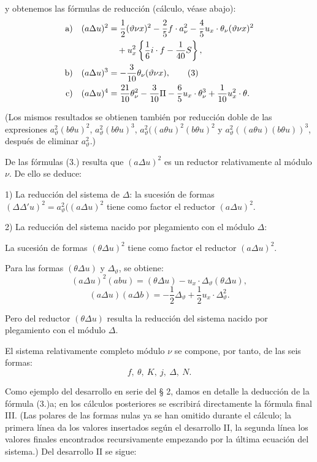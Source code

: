 \documentclass[11pt]{article}
\newcommand{\A}{\Delta}
\begin{document}
y obtenemos las fórmulas de reducción (cálculo, véase abajo):
\begin{align}
\text{a)}\quad (a\A u)^2
&=\frac12(\vartheta\nu x)^2-\frac25 f\cdot a_\nu^2
-\frac45u_x\cdot\theta_\nu(\vartheta\nu x)^2 \notag\\
&\quad+u_x^2\left\{\frac16 i\cdot f-\frac1{40}S\right\},\notag\\
\text{b)}\quad (a\A u)^3
&=-\frac3{10}\theta_\nu(\vartheta\nu x),\tag{3}\\
\text{c)}\quad (a\A u)^4
&=\frac{21}{10}\theta_\nu^2-\frac3{10}\Pi
-\frac65u_x\cdot\theta_\nu^3+\frac1{10}u_x^2\cdot\theta .\notag
\end{align}

(Los mismos resultados se obtienen también por reducción doble de las expresiones $a_\vartheta^2(b\theta u)^2$, $a_\vartheta^2(b\theta u)^3$, $a_\vartheta^2((a\theta u)^2(b\theta u)^2$ y $a_\vartheta^2((a\theta u)(b\theta u))^3$, después de eliminar $a_\vartheta^2$.)

De las fórmulas (3.) resulta que $(a\A u)^2$ es un reductor relativamente al módulo $\nu$. De ello se deduce:

1) La reducción del sistema de $\A$: la sucesión de formas $(\A\A' u)^2=a_\vartheta^2((a\A u)^2$ tiene como factor el reductor $(a\A u)^2$.

2) La reducción del sistema nacido por plegamiento con el módulo $\A$:

La sucesión de formas $(\theta\A u)^2$ tiene como factor el reductor $(a\A u)^2$.

Para las formas $(\theta\A u)$ y $\A_\vartheta$, se obtiene:
\[
(a\A u)^2(abu)=(\theta\A u)-u_x\cdot\A_\vartheta(\theta\A u),
\]
\[
(a\A u)(a\A b)=-\frac12\A_\vartheta+\frac12u_x\cdot\A_\vartheta^2.
\]

Pero del reductor $(\theta\A u)$ resulta la reducción del sistema nacido por plegamiento con el módulo $\A$.

\bigskip

El sistema relativamente completo módulo $\nu$ se compone, por tanto, de las seis formas:
\[
f,\ \theta,\ K,\ j,\ \A,\ N.
\]

Como ejemplo del desarrollo en serie del § 2, damos en detalle la deducción de la fórmula (3.)a; en los cálculos posteriores se escribirá directamente la fórmula final III. (Las polares de las formas nulas ya se han omitido durante el cálculo; la primera línea da los valores insertados según el desarrollo II, la segunda línea los valores finales encontrados recursivamente empezando por la última ecuación del sistema.) Del desarrollo II se sigue:
\end{document}

